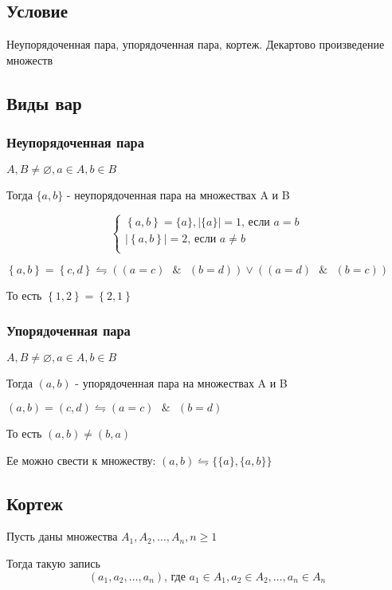 \documentclass{report}
\newcommand{\band}{\mbox{ } \& \mbox{ }}
\begin{document}
\subsection{Условие}
Неупорядоченная пара, упорядоченная пара, кортеж. Декартово произведение множеств

\subsection{Виды вар}
\subsubsection{Неупорядоченная пара}
$A, B \neq \varnothing, a \in A, b \in B$

\medskip

Тогда $\{a,b\}$ - неупорядоченная пара на множествах A и B


$$
	\begin{cases}
		\left\{a,b\right\} = \{a\},|\{a\}| = 1 \mbox{, если $a = b$} \\
		|\left\{a,b\right\}| = 2 \mbox{, если $a \neq b$}            \\
	\end{cases}
$$

$\left\{a,b\right\} = \left\{c,d\right\} \leftrightharpoons ((a = c) \band (b = d)) \lor ((a = d) \band (b = c))$

То есть $\left\{1,2\right\} = \left\{2,1\right\}$

\subsubsection{Упорядоченная пара}
$A, B \neq \varnothing, a \in A, b \in B$

Тогда $(a,b)$ - упорядоченная пара на множествах A и B

$(a,b) = (c,d) \leftrightharpoons (a = c) \band (b = d)$

То есть $(a,b) \neq (b,a)$

\medskip

Ее можно свести к множеству: $(a,b) \leftrightharpoons \{\{a\}, \{a,b\}\}$

\subsection{Кортеж}
Пусть даны множества $A_1,A_2,\ldots,A_n, n \geq 1$

\medskip

Тогда такую запись
\[
	(a_1,a_2,\ldots,a_{n}) \mbox{, где } a_1 \in A_1, a_2 \in A_2,\ldots, a_{n} \in A_{n}
\] 
\end{document}
